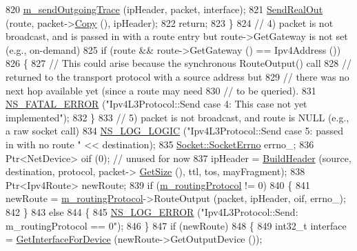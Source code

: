 \begin{DoxyCode}
820       \hyperlink{classns3_1_1Ipv4L3Protocol_a909297aa7ca87db2b7c91daefa2ed40a}{m\_sendOutgoingTrace} (ipHeader, packet, interface);
821       \hyperlink{classns3_1_1Ipv4L3Protocol_ac1baf310b12bbc564d0766061ecca323}{SendRealOut} (route, packet->\hyperlink{classns3_1_1Packet_a5d5c70802a5f77fc5f0001e0cfc1898b}{Copy} (), ipHeader);
822       \textcolor{keywordflow}{return}; 
823     \} 
824   \textcolor{comment}{// 4) packet is not broadcast, and is passed in with a route entry but route->GetGateway is not set
       (e.g., on-demand)}
825   \textcolor{keywordflow}{if} (route && route->GetGateway () == Ipv4Address ())
826     \{
827       \textcolor{comment}{// This could arise because the synchronous RouteOutput() call}
828       \textcolor{comment}{// returned to the transport protocol with a source address but}
829       \textcolor{comment}{// there was no next hop available yet (since a route may need}
830       \textcolor{comment}{// to be queried).}
831       \hyperlink{group__fatal_ga5131d5e3f75d7d4cbfd706ac456fdc85}{NS\_FATAL\_ERROR} (\textcolor{stringliteral}{"Ipv4L3Protocol::Send case 4: This case not yet implemented"});
832     \}
833   \textcolor{comment}{// 5) packet is not broadcast, and route is NULL (e.g., a raw socket call)}
834   \hyperlink{group__logging_ga88acd260151caf2db9c0fc84997f45ce}{NS\_LOG\_LOGIC} (\textcolor{stringliteral}{"Ipv4L3Protocol::Send case 5:  passed in with no route "} << destination);
835   \hyperlink{classns3_1_1Socket_ada1328c5ae0c28cb2a982caf8f6d6cca}{Socket::SocketErrno} errno\_; 
836   Ptr<NetDevice> oif (0); \textcolor{comment}{// unused for now}
837   ipHeader = \hyperlink{classns3_1_1Ipv4L3Protocol_a3737569960c655fe5441b21a5ef829d3}{BuildHeader} (source, destination, protocol, packet->
      \hyperlink{classns3_1_1Packet_a462855c9929954d4301a4edfe55f4f1c}{GetSize} (), ttl, tos, mayFragment);
838   Ptr<Ipv4Route> newRoute;
839   \textcolor{keywordflow}{if} (\hyperlink{classns3_1_1Ipv4L3Protocol_abc52052cbf9c4104be407221397c7a55}{m\_routingProtocol} != 0)
840     \{
841       newRoute = \hyperlink{classns3_1_1Ipv4L3Protocol_abc52052cbf9c4104be407221397c7a55}{m\_routingProtocol}->RouteOutput (packet, ipHeader, oif, errno\_);
842     \}
843   \textcolor{keywordflow}{else}
844     \{
845       \hyperlink{group__logging_ga0261a8db1d4ac5f79417d117634fd455}{NS\_LOG\_ERROR} (\textcolor{stringliteral}{"Ipv4L3Protocol::Send: m\_routingProtocol == 0"});
846     \}
847   \textcolor{keywordflow}{if} (newRoute)
848     \{
849       int32\_t \textcolor{keyword}{interface }= \hyperlink{classns3_1_1Ipv4L3Protocol_a4640baab6b3879020a4146f17e293321}{GetInterfaceForDevice} (newRoute->GetOutputDevice ());

\end{DoxyCode}
